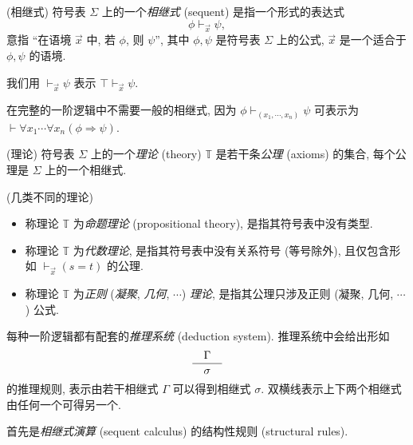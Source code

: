 \begin{definition}
	[label={sequents}]
	{(相继式)}
	符号表 $\Sigma$ 上的一个\emph{相继式} (sequent) 是指一个形式的表达式
	$$
	\phi \vdash_{\vec x} \psi,
	$$
	意指 ``在语境 $\vec x$ 中, 若 $\phi$, 则 $\psi$'', 其中 $\phi,\psi$ 是符号表 $\Sigma$ 上的公式,
	$\vec x$ 是一个适合于 $\phi,\psi$ 的语境.
	
	我们用 $\vdash_{\vec x} \psi$ 表示 $\top\vdash_{\vec x} \psi$.
\end{definition}

\begin{remark}
	[label={remark-full-first-order-logic-no-need-sequents}]
	{}
	在完整的一阶逻辑中不需要一般的相继式, 因为
	$\phi \vdash_{(x_1,\cdots,x_n)} \psi$ 可表示为
	$\vdash \forall x_1\cdots \forall x_n (\phi\Rightarrow \psi)$.
\end{remark}

\begin{definition}
	[label={theory-on-signature}]
	{(理论)}
	符号表 $\Sigma$ 上的一个\emph{理论} (theory) $\mathbb T$ 是若干条\emph{公理} (axioms) 的集合, 每个公理是 $\Sigma$ 上的一个相继式.
\end{definition}

\begin{definition}
	[label={kinds-of-theories}]
	{(几类不同的理论)}
	\begin{itemize}
		\item 称理论 $\mathbb T$ 为\emph{命题理论} (propositional theory), 是指其符号表中没有类型.
		\item 称理论 $\mathbb T$ 为\emph{代数理论}, 是指其符号表中没有关系符号 (等号除外), 且仅包含形如 $\vdash_{\vec x} (s=t)$ 的公理.
		\item 称理论 $\mathbb T$ 为\emph{正则} (\emph{凝聚}, \emph{几何}, $\cdots$) \emph{理论}, 是指其公理只涉及正则 (凝聚, 几何, $\cdots$) 公式.
	\end{itemize}
\end{definition}




每种一阶逻辑都有配套的\emph{推理系统} (deduction system). 推理系统中会给出形如
$$
\frac{\quad \Gamma \quad}{\quad \sigma \quad}
$$
的推理规则, 表示由若干相继式 $\Gamma$ 可以得到相继式 $\sigma$.
双横线表示上下两个相继式由任何一个可得另一个.

首先是\emph{相继式演算} (sequent calculus) 的结构性规则 (structural rules).


